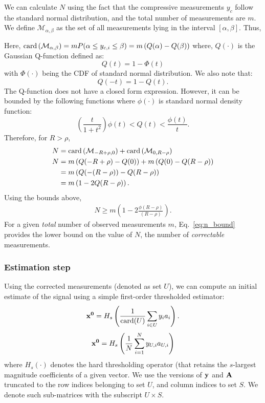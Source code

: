 We can calculate $N$ using the fact that the compressive measurements $y_c$ follow the standard normal distribution, and the total number of measurements are $m$. We define $\mathcal{M}_{\alpha,\beta}$ as the set of all measurements lying in the interval $[\alpha,\beta]$. Thus,

Here, $\mathrm{card}\left(\mathcal{M}_{\alpha,\beta}\right)=mP(\alpha \leq y_{c,i}\leq \beta) = m\left(Q(\alpha)- Q(\beta)\right)$
where, $Q(\cdot)$ is the Gaussian Q-function defined as:
$$Q(t) = 1-\Phi(t)$$ 
with $\Phi(\cdot)$ being the CDF of standard normal distribution. We also note that:
 $$Q(-t) = 1 - Q(t).$$
The Q-function does not have a closed form expression. However, it can be bounded by the following functions where $\phi(\cdot)$ is standard normal density function:
$$
\left(\frac{t}{1+t^2}\right)\phi(t) < Q(t) < \frac{\phi(t)}{t}.
$$
Therefore, for $R > \rho$,
\begin{align}
N & = \mathrm{card}\left(\mathcal{M}_{-R + \rho,0}\right) + \mathrm{card}\left(\mathcal{M}_{0, R-\rho}\right) \nonumber \\
N &  = m\left(Q(-R+\rho)- Q(0)\right) + m\left(Q(0)- Q(R-\rho)\right) \nonumber \\
& = m\left(Q(-(R-\rho))- Q(R-\rho)\right) \nonumber \\
& = m\left(1-2Q(R-\rho)\right). \nonumber
\end{align}
Using the bounds above,
\begin{align}
N \geq m \left(1-2\frac{\phi(R-\rho)}{(R-\rho)} \right).
\label{eq:n_bound}
\end{align}
%
For a given \emph{total} number of observed measurements $m$, Eq.~\ref{eq:n_bound} provides the lower bound on the value of $N$, the number of \emph{correctable} measurements.

\subsubsection{Estimation step}
Using the corrected measurements (denoted as set $U$), we can compute an initial estimate of the signal using a simple first-order thresholded estimator:
$$
\mathbf{{x}^0} = H_s\left(\frac{1}{\mathrm{card}(U)}\sum_{i\in U}y_{i}a_{i}\right).
$$
$$
\mathbf{x^0} = H_s\left( \frac{1}{N}\sum_{i=1}^{N}y_{U,i}a_{U,i}\right)
$$
where $H_s(\cdot)$ denotes the hard thresholding operator (that retains the $s$-largest magnitude coefficients of a given vector.  We use the versions of $\mathbf{y}$ and $\mathbf{A}$ truncated to the row indices belonging to set $U$, and column indices to set $S$. We denote such sub-matrices with the subscript $U\times S$. 

